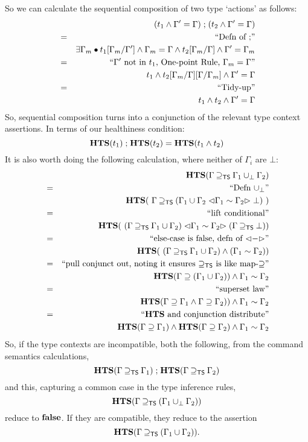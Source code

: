 So we can calculate the sequential composition of two type `actions'
as follows:
\begin{eqnarray*}
  && (t_1 \land \Gamma'=\Gamma) \mathrel{;} (t_2 \land \Gamma'=\Gamma)
\\&=&\textrm{``Defn of $\mathrel{;}$''}
\\&& \exists \Gamma_m \bullet
     t_1[\Gamma_m/\Gamma'] \land \Gamma_m=\Gamma
     \land
     t_2[\Gamma_m/\Gamma] \land \Gamma'=\Gamma_m
\\&=&\textrm{``$\Gamma'$ not in $t_1$, One-point Rule, $\Gamma_m=\Gamma$''}
\\&& t_1
     \land
     t_2[\Gamma_m/\Gamma][\Gamma/\Gamma_m] \land \Gamma'=\Gamma
\\&=&\textrm{``Tidy-up''}
\\&& t_1 \land t_2 \land \Gamma'=\Gamma
\end{eqnarray*}
So, sequential composition turns into a conjunction of the
relevant type context assertions.
In terms of our healthiness condition:
\[
  \mathbf{HTS}(t_1) \mathrel{;} \mathbf{HTS}(t_2)  = \mathbf{HTS}(t_1 \land t_2)
\]
It is also worth doing the following calculation,
where neither of $\Gamma_i$ are $\bot$:
\begin{eqnarray*}
  && \mathbf{HTS}(\Gamma \mathbin{\supseteq_{\mathsf{TS}}} \Gamma_1 \mathbin{\cup_{\bot}} \Gamma_2)
\\&=&\textrm{``Defn $\mathbin{\cup_{\bot}}$''}
\\&& \mathbf{HTS}(~\Gamma \mathbin{\supseteq_{\mathsf{TS}}} ( \Gamma_1 \cup \Gamma_2
                   \mathrel{\lhd{\Gamma_1\sim\Gamma_2}\rhd}
                   \bot)~)
\\&=&\textrm{``lift conditional''}
\\&& \mathbf{HTS}(~(\Gamma \mathbin{\supseteq_{\mathsf{TS}}} \Gamma_1 \cup \Gamma_2)
            \mathrel{\lhd{\Gamma_1\sim\Gamma_2}\rhd}
            (\Gamma \mathbin{\supseteq_{\mathsf{TS}}} \bot))
\\&=&\textrm{``else-case is false, defn of $\mathrel{\lhd{-}\rhd}$''}
\\&& \mathbf{HTS}(~(\Gamma \mathbin{\supseteq_{\mathsf{TS}}} \Gamma_1 \cup \Gamma_2)
            \land (\Gamma_1\sim\Gamma_2))
\\&=&\textrm{``pull conjunct out, noting it ensures $\mathbin{\supseteq_{\mathsf{TS}}}$ is like map-$\supseteq$''}
\\&& \mathbf{HTS}(\Gamma \supseteq ( \Gamma_1 \cup \Gamma_2))
            \land \Gamma_1\sim\Gamma_2
\\&=&\textrm{``superset law''}
\\&& \mathbf{HTS}(\Gamma \supseteq \Gamma_1 \land \Gamma \supseteq \Gamma_2))
            \land \Gamma_1\sim\Gamma_2
\\&=&\textrm{``$\mathbf{HTS}$ and conjunction distribute''}
\\&& \mathbf{HTS}(\Gamma \supseteq \Gamma_1)
     \land \mathbf{HTS}(\Gamma \supseteq \Gamma_2)
            \land \Gamma_1\sim\Gamma_2
\end{eqnarray*}
So, if the type contexts are incompatible,
both the following, from the command semantics calculations,
\[
  \mathbf{HTS}(\Gamma\mathbin{\supseteq_{\mathsf{TS}}}\Gamma_1) \mathrel{;} \mathbf{HTS}(\Gamma\mathbin{\supseteq_{\mathsf{TS}}}\Gamma_2)
\]
and this, capturing a common case in the type inference rules,
\[
  \mathbf{HTS}(\Gamma\mathbin{\supseteq_{\mathsf{TS}}}(\Gamma_1\mathbin{\cup_{\bot}}\Gamma_2))
\]
reduce to $\mathbf{false}$.
If they are compatible, they reduce to the assertion
\[
  \mathbf{HTS}(\Gamma\mathbin{\supseteq_{\mathsf{TS}}}(\Gamma_1\cup\Gamma_2)).
\]
